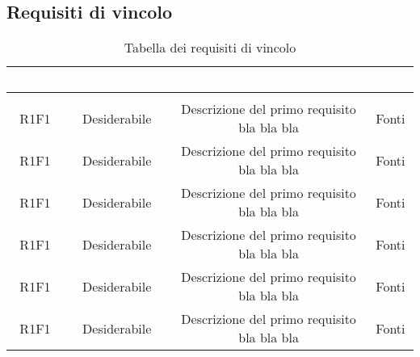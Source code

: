 \subsection{Requisiti di vincolo}
\renewcommand{\arraystretch}{1.5}
\begin{center}
\begin{longtable}{C{\colA} C{\colB} C{\colC} C{\colA}}
		\textcolor{white}{\textbf{Codice}} & 
		\textcolor{white}{\textbf{Classificazione}} & 
		\textcolor{white}{\textbf{Descrizione}} & 
		\textcolor{white}{\textbf{Fonti}} \\
		\endfirsthead
	    \\
	    \endfoot
	    \caption{Tabella dei requisiti di vincolo}
	    \endlastfoot

R1F1 & Desiderabile & Descrizione del primo requisito bla bla bla & Fonti \\
R1F1 & Desiderabile & Descrizione del primo requisito bla bla bla & Fonti \\
R1F1 & Desiderabile & Descrizione del primo requisito bla bla bla & Fonti \\
R1F1 & Desiderabile & Descrizione del primo requisito bla bla bla & Fonti \\
R1F1 & Desiderabile & Descrizione del primo requisito bla bla bla & Fonti \\
R1F1 & Desiderabile & Descrizione del primo requisito bla bla bla & Fonti \\
\end{longtable}
\end{center}